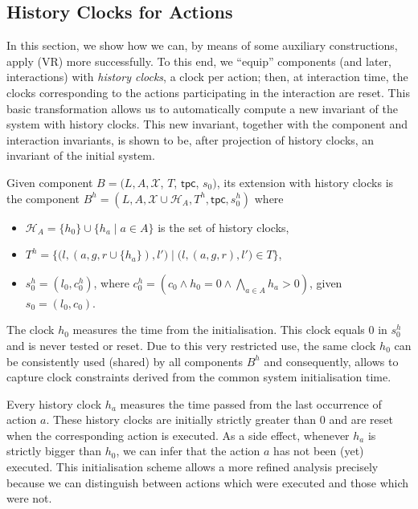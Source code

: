 \documentclass{LMCS}
\newcommand{\hp}{\mathcal{H}_A}
\newcommand{\X}{\mathcal{X}}
\newcommand{\inv}{\mathsf{tpc}}
\newcommand{\cn}{\mathit{B}\xspace}
\newcommand{\te}{h_0}
\theoremstyle{plain}\newtheorem{remark}[thm]{Remark}
\theoremstyle{plain}\newtheorem{example}[thm]{Example}
\begin{document}
\subsection{History Clocks for Actions}

In this section, we show how we can, by means of some auxiliary
constructions, apply (VR) more successfully. To this end, we ``equip''
components (and later, interactions) with \textit{history clocks}, a
clock per action; then, at interaction time, the clocks corresponding
to the actions participating in the interaction are reset. This basic
transformation allows us to automatically compute a new invariant of
the system with history clocks. This new invariant, together with the
component and interaction invariants, is shown to be, after projection
of history clocks, an invariant of the initial system.

\begin{defi} Given component $\cn = (L, A,
  \X$, $T$, $\inv$, $s_0)$, its extension with history clocks is the component $
  \cn^h = (L, A, \X \cup \hp, T^h, \inv, s_0^h)$ where
\begin{itemize}
\item $\hp = \{\te\} \cup \{h_a \mid a \in A\}$ is the set of history
  clocks,
\item $T^h = \big\{\big(l, (a, g, r \cup \{h_a \}), l'\big) \mid \big(l,
  (a, g, r), l'\big) \in T\big\}$,
\item $s_0^h = (l_0,c_0^h)$, where $c_0^h = (c_0 \wedge \te = 0 \wedge
  \bigwedge_{a \in A} h_a > 0)$, given $s_0 = (l_0, c_0)$.
\end{itemize}
\label{def:cha}
\end{defi}

The clock $\te$ measures the time from the initialisation.  This clock
equals 0 in $s_0^h$ and is never tested or reset.  Due to this very
restricted use, the same clock $\te$ can be consistently used (shared) by
all components $B^h$ and consequently, allows to capture clock constraints
derived from the common system initialisation time.

Every history clock $h_a$ measures the time passed from the last
occurrence of action $a$.  These history clocks are initially strictly
greater than $0$ and are reset when the corresponding action is
executed. As a side effect, whenever $h_a$ is strictly bigger than
$\te$, we can infer that the action $a$ has not been (yet) executed.
This initialisation scheme allows a more refined analysis precisely
because we can distinguish between actions which were executed and
those which were not.
\end{document}
